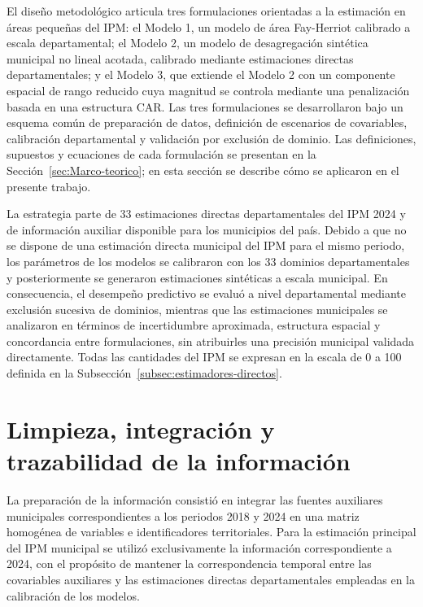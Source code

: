 \label{sec:metodologia}

El diseño metodológico articula tres formulaciones orientadas a la estimación en áreas pequeñas del IPM: el Modelo 1, un modelo de área Fay-Herriot calibrado a escala departamental; el Modelo 2, un modelo de desagregación sintética municipal no lineal acotada, calibrado mediante estimaciones directas departamentales; y el Modelo 3, que extiende el Modelo 2 con un componente espacial de rango reducido cuya magnitud se controla mediante una penalización basada en una estructura CAR. Las tres formulaciones se desarrollaron bajo un esquema común de preparación de datos, definición de escenarios de covariables, calibración departamental y validación por exclusión de dominio. Las definiciones, supuestos y ecuaciones de cada formulación se presentan en la Sección~\ref{sec:Marco-teorico}; en esta sección se describe cómo se aplicaron en el presente trabajo.

La estrategia parte de 33 estimaciones directas departamentales del IPM 2024 y de información auxiliar disponible para los municipios del país. Debido a que no se dispone de una estimación directa municipal del IPM para el mismo periodo, los parámetros de los modelos se calibraron con los 33 dominios departamentales y posteriormente se generaron estimaciones sintéticas a escala municipal. En consecuencia, el desempeño predictivo se evaluó a nivel departamental mediante exclusión sucesiva de dominios, mientras que las estimaciones municipales se analizaron en términos de incertidumbre aproximada, estructura espacial y concordancia entre formulaciones, sin atribuirles una precisión municipal validada directamente. Todas las cantidades del IPM se expresan en la escala de 0 a 100 definida en la Subsección~\ref{subsec:estimadores-directos}.


\section{Limpieza, integración y trazabilidad de la información}
\label{sec:met-limpieza}

La preparación de la información consistió en integrar las fuentes auxiliares municipales correspondientes a los periodos 2018 y 2024 en una matriz homogénea de variables e identificadores territoriales. Para la estimación principal del IPM municipal se utilizó exclusivamente la información correspondiente a 2024, con el propósito de mantener la correspondencia temporal entre las covariables auxiliares y las estimaciones directas departamentales empleadas en la calibración de los modelos.

